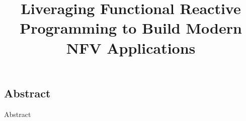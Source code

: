 \title{\Large \bf Liveraging Functional Reactive Programming to Build Modern NFV Applications}

\maketitle

\subsection*{Abstract}
Abstract






{\footnotesize 
}









